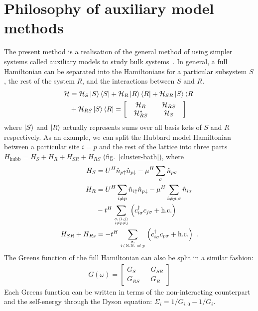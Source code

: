 \documentclass[reprint,hidelinks]{revtex4-2}
\begin{document}
\section{Philosophy of auxiliary model methods}
The present method is a realisation of the general method of using simpler systems called auxiliary models to study bulk systems~\cite{martin_2016}. In general, a full Hamiltonian can be separated into the Hamiltonians for a particular subsystem \(S\), the rest of the system \(R\), and the interactions between \(S\) and \(R\).
\begin{equation}\begin{aligned}
	\mathcal{H} &= \mathcal{H}_S\ket{S}\bra{S} + \mathcal{H}_R \ket{R}\bra{R} + \mathcal{H}_{SR} \ket{S}\bra{R} \\
				&+ \mathcal{H}_{RS}\ket{S}\bra{R} = \begin{bmatrix} & \mathcal{H}_{R} && \mathcal{H}_{RS} & \\ & \mathcal{H}_{RS}^* && \mathcal{H}_{S} & \end{bmatrix}
\end{aligned}\end{equation}
where \(\ket{S}\) and \(\ket{R}\) actually represents sums over all basis kets of \(S\) and \(R\) respectively. As an example, we can split the Hubbard model Hamiltonian between a particular site \(i = p\) and the rest of the lattice into three parts \(H_\text{hubb} = H_S + H_R + H_{SR} + H_{RS}\) (fig.~\ref{cluster-bath}), where
\begin{equation}\begin{aligned}
	H_S &= U^H\hat n_{p \uparrow} \hat n_{p \downarrow} - \mu^H \sum_\sigma \hat n_{p \sigma}\\
	H_R &= U^H\sum_{i \neq p}\hat n_{i \uparrow} \hat n_{p \downarrow} - \mu^H \sum_{i \neq p, \sigma} \hat n_{i \sigma} \\
		&-t^H\sum_{\sigma,\left<i,j \right>\atop{i \neq p \neq j}}\left(c^\dagger_{i\sigma} c_{j\sigma} + \text{h.c.}\right) \\
	H_{SR} + H_{Rs} &= - t^H\sum_{\sigma,\atop{i \in \text{N.N. of }p}}\left(c^\dagger_{i\sigma} c_{p\sigma} + \text{h.c.}\right)~.
\end{aligned}\end{equation}
The Greens function of the full Hamiltonian can also be split in a similar fashion:
\begin{equation}\begin{aligned}
	G(\omega) = \begin{bmatrix} G_S && G_{SR} \\ G_{RS} && G_R \end{bmatrix}
\end{aligned}\end{equation}
Each Greens function can be written in terms of the non-interacting counterpart and the self-energy through the Dyson equation: \(\Sigma_i = 1/G_{i,0} - 1/G_i\).
\end{document}
